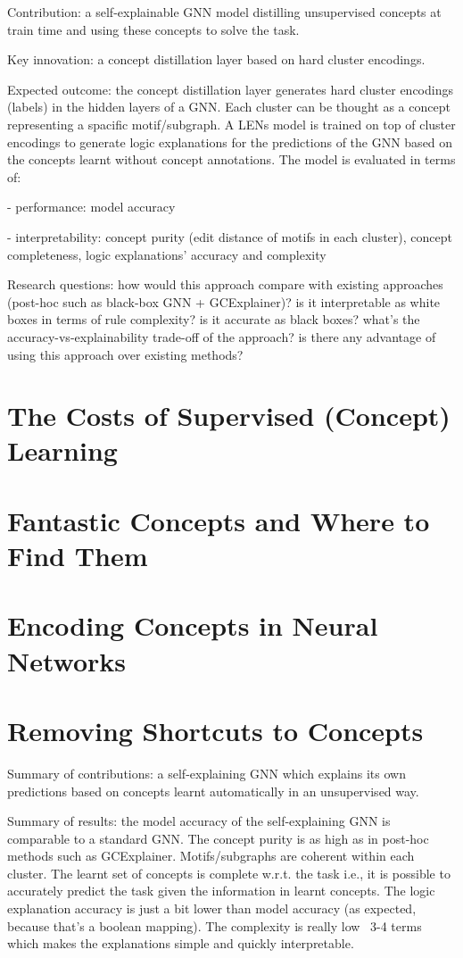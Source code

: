 \documentclass[withindex,glossary]{cam-thesis}
\begin{document}
Contribution: a self-explainable GNN model distilling unsupervised concepts at train time and using these concepts to solve the task.

Key innovation: a concept distillation layer based on hard cluster encodings.

Expected outcome: the concept distillation layer generates hard cluster encodings (labels) in the hidden layers of a GNN. Each cluster can be thought as a concept representing a spacific motif/subgraph. A LENs model is trained on top of cluster encodings to generate logic explanations for the predictions of the GNN based on the concepts learnt without concept annotations. The model is evaluated in terms of:

- performance: model accuracy

- interpretability: concept purity (edit distance of motifs in each cluster), concept completeness, logic explanations' accuracy and complexity

Research questions: how would this approach compare with existing approaches (post-hoc such as black-box GNN + GCExplainer)? is it interpretable as white boxes in terms of rule complexity? is it accurate as black boxes? what's the accuracy-vs-explainability trade-off of the approach? is there any advantage of using this approach over existing methods?


\section{The Costs of Supervised (Concept) Learning}

\section{Fantastic Concepts and Where to Find Them}

\section{Encoding Concepts in Neural Networks}

\section{Removing Shortcuts to Concepts}


Summary of contributions: a self-explaining GNN which explains its own predictions based on concepts learnt automatically in an unsupervised way.

Summary of results: the model accuracy of the self-explaining GNN is comparable to a standard GNN. The concept purity is as high as in post-hoc methods such as GCExplainer. Motifs/subgraphs are coherent within each cluster. The learnt set of concepts is complete w.r.t. the task i.e., it is possible to accurately predict the task given the information in learnt concepts. The logic explanation accuracy is just a bit lower than model accuracy (as expected, because that's a boolean mapping). The complexity is really low ~3-4 terms which makes the explanations simple and quickly interpretable.
\end{document}

